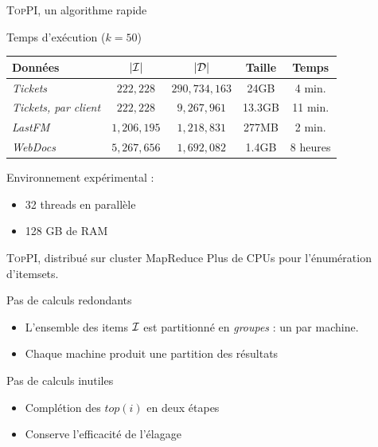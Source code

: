 \documentclass[table]{beamer}
\providecommand{\toppi}{\mbox{\textsc{TopPI}}}
\begin{document}
\begin{frame}{\toppi, un algorithme rapide}
  \begin{block}{Temps d'exécution ($k=50$)}
    \centering
    \begin{tabular}{|l|c|c|c|c|}
      \hline
      {\bf Données}    & $|{\cal I}|$ & $|{\cal D}|$ & {\bf Taille} & {\bf Temps} \\\hline
      \textit{Tickets} & $222,228$ & $290,734,163$ & 24GB          & 4 min. \\\hline
      \textit{Tickets, par client} & $222,228$ & $9,267,961$ & 13.3GB           & 11 min. \\\hline
      \textit{LastFM}  & $1,206,195$ & $1,218,831$ & 277MB          & 2 min. \\\hline
      \textit{WebDocs} & $5,267,656$ & $1,692,082$ & 1.4GB           & 8 heures \\\hline
    \end{tabular}
  \end{block}

  Environnement expérimental :
  \begin{itemize}
    \item 32 threads en parallèle
    \item 128 GB de RAM
  \end{itemize}
\end{frame}


\begin{frame}{\toppi, distribué sur cluster MapReduce}
  Plus de CPUs pour l'énumération d'itemsets.
  \\\vspace{1em}
  \pause
  \begin{block}{Pas de calculs redondants}
    \begin{itemize}
      \item L'ensemble des items $\cal I$ est partitionné en {\em groupes} : un par machine.
      \item Chaque machine produit une partition des résultats
    \end{itemize}
    \end{block}
    \pause
    \begin{block}{Pas de calculs inutiles}
      \begin{itemize}
        \item Complétion des $\mathit{top}(i)$ en deux étapes
        \item Conserve l'efficacité de l'élagage
      \end{itemize}
  \end{block}
\end{frame}
\end{document}
